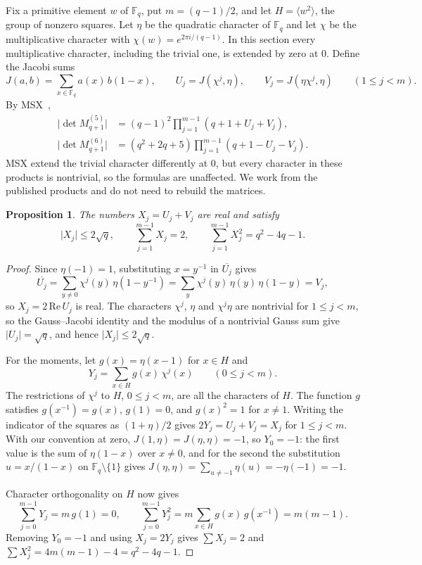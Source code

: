 \documentclass[11pt]{article}
\newtheorem{proposition}[theorem]{Proposition}
\newcommand{\F}{\mathbb F}
\newcommand{\abs}[1]{\lvert#1\rvert}
\begin{document}
Fix a primitive element $w$ of $\F_q$, put $m=(q-1)/2$, and let
$H=\langle w^2\rangle$, the group of nonzero squares. Let $\eta$ be the
quadratic character of $\F_q$ and let $\chi$ be the multiplicative
character with $\chi(w)=e^{2\pi i/(q-1)}$. In this section every
multiplicative character, including the trivial one, is extended by zero
at $0$. Define the Jacobi sums
\[
 J(a,b)=\sum_{x\in\F_q}a(x)\,b(1-x),\qquad
 U_j=J(\chi^j,\eta),\qquad V_j=J(\eta\chi^j,\eta)\qquad(1\le j<m).
\]
By MSX~\cite[Theorems 1.6 and 4.1 and Propositions 2.6, 2.8 and 4.2]{MSX},
\begin{align}
 \abs{\det M^{(5)}_{q+1}}&=(q-1)^2\prod_{j=1}^{m-1}(q+1+U_j+V_j),
   \label{eq:D5}\\
 \abs{\det M^{(6)}_{q+1}}&=(q^2+2q+5)\prod_{j=1}^{m-1}(q+1-U_j-V_j).
   \label{eq:D6}
\end{align}
MSX extend the trivial character differently at $0$, but every character
in these products is nontrivial, so the formulas are unaffected. We work
from the published products and do not need to rebuild the matrices.

\begin{proposition}\label{prop:mom56}
The numbers $X_j=U_j+V_j$ are real and satisfy
\begin{equation}\label{eq:mom56}
 \abs{X_j}\le2\sqrt q,\qquad
 \sum_{j=1}^{m-1}X_j=2,\qquad
 \sum_{j=1}^{m-1}X_j^2=q^2-4q-1.
\end{equation}
\end{proposition}
\begin{proof}
Since $\eta(-1)=1$, substituting $x=y^{-1}$ in $\overline{U_j}$ gives
\[
 \overline{U_j}=\sum_{y\ne0}\chi^j(y)\,\eta(1-y^{-1})
 =\sum_y\chi^j(y)\,\eta(y)\,\eta(1-y)=V_j ,
\]
so $X_j=2\,\mathrm{Re}\,U_j$ is real. The characters $\chi^j$, $\eta$ and
$\chi^j\eta$ are nontrivial for $1\le j<m$, so the Gauss--Jacobi identity
and the modulus of a nontrivial Gauss sum give $\abs{U_j}=\sqrt q$, and
hence $\abs{X_j}\le2\sqrt q$.

For the moments, let $g(x)=\eta(x-1)$ for $x\in H$ and
\[
 Y_j=\sum_{x\in H}g(x)\,\chi^j(x)\qquad(0\le j<m).
\]
The restrictions of $\chi^j$ to $H$, $0\le j<m$, are all the characters of
$H$. The function $g$ satisfies $g(x^{-1})=g(x)$, $g(1)=0$, and $g(x)^2=1$
for $x\ne1$. Writing the indicator of the squares as $(1+\eta)/2$ gives
$2Y_j=U_j+V_j=X_j$ for $1\le j<m$. With our convention at zero,
$J(1,\eta)=J(\eta,\eta)=-1$, so $Y_0=-1$: the first value is the sum of
$\eta(1-x)$ over $x\ne0$, and for the second the substitution
$u=x/(1-x)$ on $\F_q\setminus\{1\}$ gives
$J(\eta,\eta)=\sum_{u\ne-1}\eta(u)=-\eta(-1)=-1$.

Character orthogonality on $H$ now gives
\[
 \sum_{j=0}^{m-1}Y_j=m\,g(1)=0,\qquad
 \sum_{j=0}^{m-1}Y_j^2=m\sum_{x\in H}g(x)\,g(x^{-1})=m(m-1).
\]
Removing $Y_0=-1$ and using $X_j=2Y_j$ gives $\sum X_j=2$ and
$\sum X_j^2=4m(m-1)-4=q^2-4q-1$.
\end{proof}
\end{document}
